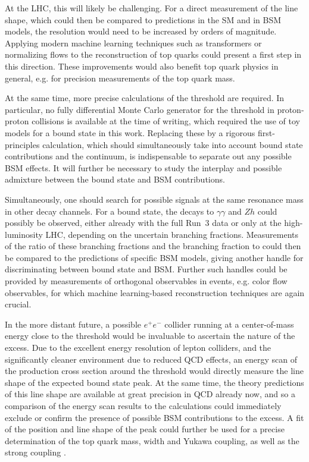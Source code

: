 \newpage

At the LHC, this will likely be challenging. For a direct measurement of the line shape, which could then be compared to predictions in the SM and in BSM models, the \mtt resolution would need to be increased by orders of magnitude. Applying modern machine learning techniques such as transformers or normalizing flows to the reconstruction of top quarks could present a first step in this direction. These improvements would also benefit top quark physics in general, e.g. for precision measurements of the top quark mass.

At the same time, more precise calculations of the \ttbar threshold are required. In particular, no fully differential Monte Carlo generator for the \ttbar threshold in proton-proton collisions is available at the time of writing, which required the use of toy models for a \ttbar bound state in this work. Replacing these by a rigorous first-principles calculation, which should simultaneously take into account bound state contributions and the \ttbar continuum, is indispensable to separate out any possible BSM effects. It will further be necessary to study the interplay and possible admixture between the bound state and BSM contributions.

Simultaneously, one should search for possible signals at the same resonance mass in other decay channels. For a \ttbar bound state, the decays to $\gamma\gamma$ and $Zh$ could possibly be observed, either already with the full Run~3 data or only at the high-luminosity LHC, depending on the uncertain branching fractions. Measurements of the ratio of these branching fractions and the branching fraction to \ttbar could then be compared to the predictions of specific BSM models, giving another handle for discriminating between \ttbar bound state and BSM. Further such handles could be provided by measurements of orthogonal observables in \ttbar events, e.g. color flow observables, for which machine learning-based reconstruction techniques are again crucial.

In the more distant future, a possible $e^+e^-$ collider running at a center-of-mass energy close to the \ttbar threshold would be invaluable to ascertain the nature of the excess. Due to the excellent energy resolution of lepton colliders, and the significantly cleaner environment due to reduced QCD effects, an energy scan of the \ttbar production cross section around the threshold would directly measure the line shape of the expected bound state peak. At the same time, the theory predictions of this line shape are available at great precision in QCD already now, and so a comparison of the energy scan results to the calculations could immediately exclude or confirm the presence of possible BSM contributions to the excess. A fit of the position and line shape of the peak could further be used for a precise determination of the top quark mass, width and Yukawa coupling, as well as the strong coupling \alphas.

